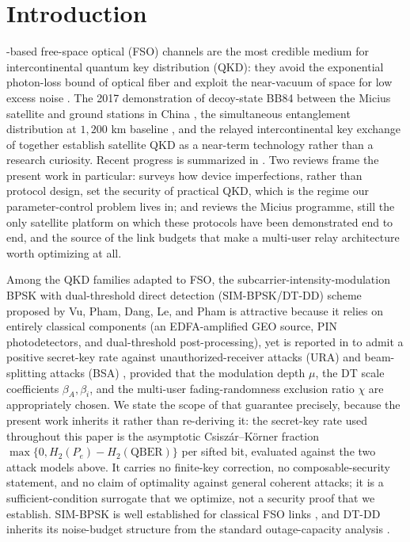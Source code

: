 \section{Introduction}\label{sec:intro}

-based free-space optical (FSO) channels are the most credible medium for intercontinental quantum key distribution (QKD): they avoid the exponential photon-loss bound of optical fiber and exploit the near-vacuum of space for low excess noise \cite{liao2017micius,bedington2017progress,sidhu2021advances,pirandola2020advances}. The 2017 demonstration of decoy-state BB84 between the Micius satellite and ground stations in China \cite{liao2017micius}, the simultaneous entanglement distribution at $1{,}200$ km baseline \cite{yin2017satellite}, and the relayed intercontinental key exchange of \cite{liao2018satellite} together establish satellite QKD as a near-term technology rather than a research curiosity. Recent progress is summarized in \cite{sidhu2021advances,pirandola2020advances}. Two reviews frame the present work in particular: \cite{xu2020rmp} surveys how device imperfections, rather than protocol design, set the security of practical QKD, which is the regime our parameter-control problem lives in; and \cite{lu2022micius} reviews the Micius programme, still the only satellite platform on which these protocols have been demonstrated end to end, and the source of the link budgets that make a multi-user relay architecture worth optimizing at all.

Among the QKD families adapted to FSO, the subcarrier-intensity-modulation BPSK with dual-threshold direct detection (SIM-BPSK/DT-DD) scheme proposed by Vu, Pham, Dang, Le, and Pham \cite{vu2020access,vu2022access,vu2023photonics} is attractive because it relies on entirely classical components (an EDFA-amplified GEO source, PIN photodetectors, and dual-threshold post-processing), yet is reported in \cite{vu2020access,vu2022access,vu2023photonics} to admit a positive secret-key rate against unauthorized-receiver attacks (URA) and beam-splitting attacks (BSA) \cite{lutkenhaus1999estimates,huttner1995quantum}, provided that the modulation depth $\mu$, the DT scale coefficients $\beta_A, \beta_i$, and the multi-user fading-randomness exclusion ratio $\chi$ are appropriately chosen. We state the scope of that guarantee precisely, because the present work inherits it rather than re-deriving it: the secret-key rate used throughout this paper is the asymptotic Csisz\'ar--K\"orner fraction $\max\{0, H_2(P_e) - H_2(\mathrm{QBER})\}$ per sifted bit, evaluated against the two attack models above. It carries no finite-key correction, no composable-security statement, and no claim of optimality against general coherent attacks; it is a sufficient-condition surrogate that we optimize, not a security proof that we establish. SIM-BPSK is well established for classical FSO links \cite{popoola2009bpsk,kaushal2017fso}, and DT-DD inherits its noise-budget structure from the standard outage-capacity analysis \cite{farid2007outage,sandalidis2008ber}.

